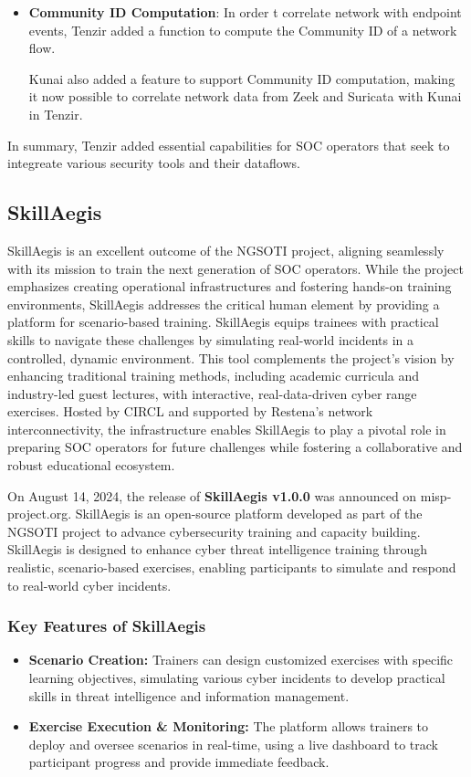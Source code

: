 \begin{itemize}
\item \textbf{Community ID Computation}: In order t correlate network with
	endpoint events, Tenzir added a function to compute the Community ID of
	a network
	flow\cite{tenzir_community_ids}.

	Kunai also added a feature to support Community ID computation, making
	it now possible to correlate network data from Zeek and Suricata with
	Kunai in Tenzir.
\end{itemize}

In summary, Tenzir added essential capabilities for SOC operators that seek to
integreate various security tools and their dataflows.

\subsection{SkillAegis}
SkillAegis is an excellent outcome of the NGSOTI project, aligning seamlessly with its mission to train the next generation of SOC operators. While the project emphasizes creating operational infrastructures and fostering hands-on training environments, SkillAegis addresses the critical human element by providing a platform for scenario-based training.
SkillAegis equips trainees with practical skills to navigate these challenges by simulating real-world incidents in a controlled, dynamic environment.
This tool complements the project's vision by enhancing traditional training methods, including academic curricula and industry-led guest lectures, with interactive, real-data-driven cyber range exercises. Hosted by CIRCL and supported by Restena's network interconnectivity, the infrastructure enables SkillAegis to play a pivotal role in preparing SOC operators for future challenges while fostering a collaborative and robust educational ecosystem.

On August 14, 2024, the release of \textbf{SkillAegis v1.0.0} was announced on misp-project.org. SkillAegis is an open-source platform developed as part of the NGSOTI project to advance cybersecurity training and capacity building. SkillAegis is designed to enhance cyber threat intelligence training through realistic, scenario-based exercises, enabling participants to simulate and respond to real-world cyber incidents.

\subsubsection{Key Features of SkillAegis}
\begin{itemize}
	\item \textbf{Scenario Creation:} Trainers can design customized exercises with specific learning objectives, simulating various cyber incidents to develop practical skills in threat intelligence and information management.
	\item \textbf{Exercise Execution \& Monitoring:} The platform allows trainers to deploy and oversee scenarios in real-time, using a live dashboard to track participant progress and provide immediate feedback.
\end{itemize}


